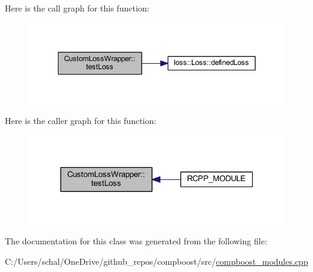 Here is the call graph for this function\+:\nopagebreak
\begin{figure}[H]
\begin{center}
\leavevmode
\includegraphics[width=349pt]{class_custom_loss_wrapper_a6430fb3e6c2cfaea13e64645ab80d8b7_cgraph}
\end{center}
\end{figure}
Here is the caller graph for this function\+:\nopagebreak
\begin{figure}[H]
\begin{center}
\leavevmode
\includegraphics[width=320pt]{class_custom_loss_wrapper_a6430fb3e6c2cfaea13e64645ab80d8b7_icgraph}
\end{center}
\end{figure}


The documentation for this class was generated from the following file\+:\begin{DoxyCompactItemize}
\item 
C\+:/\+Users/schal/\+One\+Drive/github\+\_\+repos/compboost/src/\mbox{\hyperlink{compboost__modules_8cpp}{compboost\+\_\+modules.\+cpp}}\end{DoxyCompactItemize}
